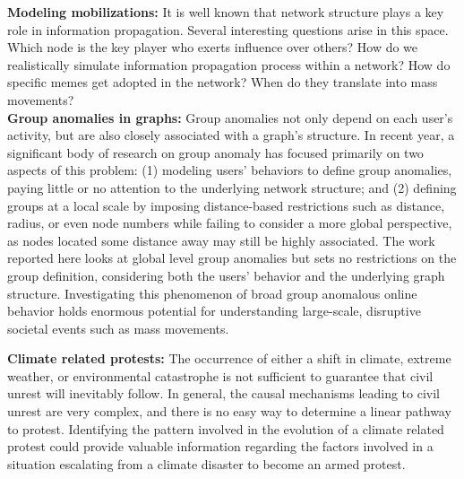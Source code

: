 \noindent
{\bf Modeling mobilizations:}
It is well known that network structure plays a key role in information propagation.
Several interesting questions arise in this space. Which node is the key player who exerts influence over others? How do we realistically simulate information propagation process within a network?
How do specific memes get adopted in the network? When do they translate into mass movements?\\

\noindent
{\bf Group anomalies in graphs:}
Group anomalies not only depend on each user's activity, but are also closely associated with a graph's structure. In recent year, a significant body of research on group anomaly has focused primarily on two aspects of this problem: (1) modeling users' behaviors to define group anomalies, paying little or no attention to the underlying network structure; and (2) defining groups at a local scale by imposing distance-based restrictions such as distance, radius, or even node numbers while failing to consider a more global perspective, as nodes located some distance away may still be highly associated. The work reported here looks at global level group anomalies but sets no restrictions on the group definition, considering both the users' behavior and the underlying graph structure. Investigating this phenomenon of broad group anomalous online behavior holds enormous potential for understanding large-scale, disruptive societal events such as mass movements.


\noindent
{\bf Climate related protests:}
The occurrence of either a shift in climate, extreme weather, or environmental catastrophe is not sufficient to guarantee that civil unrest will inevitably follow. In general, the causal mechanisms leading to civil unrest are very complex, and there is no easy way to determine a linear pathway to protest. Identifying the pattern involved in the evolution of a climate related protest could provide valuable information regarding the factors involved in a situation escalating from a climate disaster to become an armed protest.



